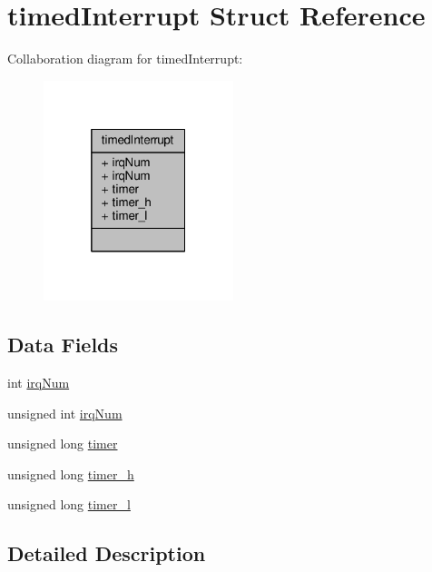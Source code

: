 \hypertarget{structtimedInterrupt}{\section{timed\+Interrupt Struct Reference}
\label{structtimedInterrupt}
}


Collaboration diagram for timed\+Interrupt\+:
\nopagebreak
\begin{figure}[H]
\begin{center}
\leavevmode
\includegraphics[width=157pt]{structtimedInterrupt__coll__graph}
\end{center}
\end{figure}
\subsection*{Data Fields}
\begin{DoxyCompactItemize}
\item 
int \hyperlink{structtimedInterrupt_a7e3743a35e009262953f43a25e65b321_a7e3743a35e009262953f43a25e65b321}{irq\+Num}
\item 
unsigned int \hyperlink{structtimedInterrupt_afe863922719ad198b647157e5c0ab5f2_afe863922719ad198b647157e5c0ab5f2}{irq\+Num}
\item 
unsigned long \hyperlink{structtimedInterrupt_a22ab02fd7b04fa04d1c1dea800bac62e_a22ab02fd7b04fa04d1c1dea800bac62e}{timer}
\item 
unsigned long \hyperlink{structtimedInterrupt_ae0c686eadc5df51274fae964275a1814_ae0c686eadc5df51274fae964275a1814}{timer\+\_\+h}
\item 
unsigned long \hyperlink{structtimedInterrupt_ac3d76cbc80f17f677b307910b5c0da97_ac3d76cbc80f17f677b307910b5c0da97}{timer\+\_\+l}
\end{DoxyCompactItemize}


\subsection{Detailed Description}



